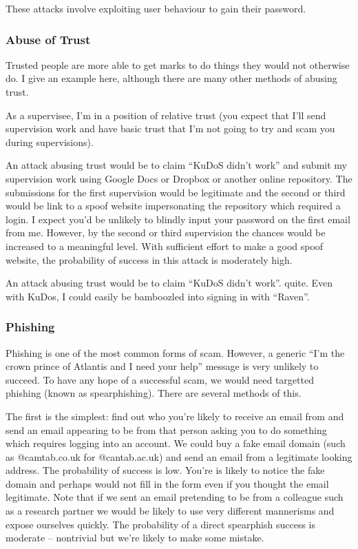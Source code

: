 \documentclass[10pt,\jkfside,a4paper]{article}
\begin{document}
\begin{enumerate}
These attacks involve exploiting user behaviour to gain their password.

\subsubsection*{Abuse of Trust}

Trusted people are more able to get marks to do things they would not otherwise do. I give an example 
here, although there are many other methods of abusing trust.

As a supervisee, I'm in a position of relative trust (you expect that I'll send supervision work and have basic 
trust that I'm not going to try and scam you during supervisions).

An attack abusing trust would be to claim ``KuDoS didn't work'' and submit my 
supervision work using Google Docs or Dropbox or another online repository. The submissions for the 
first supervision would be legitimate and the second or third would be link to a spoof website 
impersonating the repository which required a login. I expect you'd be unlikely to blindly input your 
password on the first email from me. However, by the second or third supervision the chances would be 
increased to a meaningful level. With sufficient effort to make a good spoof website, the probability 
of success in this attack is moderately high.

{\color{blue} An attack abusing trust would be to claim ``KuDoS didn't work''. quite. Even
with KuDos, I could easily be bamboozled into signing in with ``Raven''.}

\subsubsection*{Phishing}

Phishing is one of the most common forms of scam. However, a 
generic ``I'm the crown prince of Atlantis and I need your help'' message is very unlikely to succeed. 
To have any hope of a successful scam, we would need targetted phishing (known as spearphishing). 
There are several methods of this. 

The first is the simplest: find out who you're likely to receive an email from and send an email appearing 
to be from that person asking you to do something which requires logging into an account. We could buy 
a fake email domain (such as @camtab.co.uk for @cantab.ac.uk) and send an 
email from a legitimate looking address. The probability of success is low. 
You're is likely to notice the fake domain and perhaps would not fill in the form even if you thought 
the email legitimate. Note that if we sent an email pretending to be from a colleague such as a 
research partner we would be likely to use very different mannerisms and expose ourselves quickly. 
The probability of a direct spearphish success is moderate -- nontrivial but we're likely to make 
some mistake.


\end{enumerate}
\end{document}
